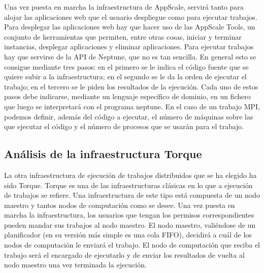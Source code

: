 Una vez puesta en marcha la infraestructura de AppScale, servirá tanto para alojar las aplicaciones web que el usuario despliegue como para ejecutar trabajos. Para desplegar las aplicaciones web hay que hacer uso de las AppScale Tools, un conjunto de herramientas que permiten, entre otras cosas, iniciar y terminar instancias, desplegar aplicaciones y eliminar aplicaciones. Para ejecutar trabajos hay que servirse de la API de Neptune, que no es tan sencilla. En general esto se consigue mediante tres pasos: en el primero se le indica el código fuente que se quiere subir a la infraestructura; en el segundo se le da la orden de ejecutar el trabajo; en el tercero se le piden los resultados de la ejecución. Cada uno de estos pasos debe indicarse, mediante un lenguaje específico de dominio, en un fichero que luego se interpretará con el programa neptune. En el caso de un trabajo MPI, podemos definir, además del código a ejecutar, el número de máquinas sobre las que ejecutar el código y el número de procesos que se usarán para el trabajo.


\subsection{Análisis de la infraestructura Torque}

La otra infraestructura de ejecución de trabajos distribuidos que se ha elegido ha sido Torque. Torque es una de las infraestructuras clásicas en lo que a ejecución de trabajos se refiere. Una infraestructura de este tipo está compuesta de un nodo maestro y tantos nodos de computación como se desee. Una vez puesta en marcha la infraestructura, los usuarios que tengan los permisos correspondientes pueden mandar sus trabajos al nodo maestro. El nodo maestro, valiéndose de un planificador (en su versión más simple es una cola FIFO), decidirá a cuál de los nodos de computación le enviará el trabajo. El nodo de computación que reciba el trabajo será el encargado de ejecutarlo y de enviar los resultados de vuelta al nodo maestro una vez terminada la ejecución.
